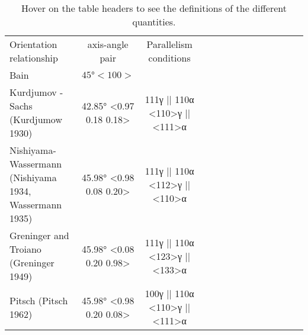 
\begin{table*}
\caption{Hover on the table headers to see the definitions of the  different quantities.}
\label{table}
\begin{tabular}{l c | c c c c c c  c c c c c c}
\hline\hline
    Orientation relationship & axis-angle pair & Parallelism conditions \\
    Bain \cite{bain1924nature} & \(45°<100>\) &  \\
    Kurdjumov -Sachs (Kurdjumow 1930) & 42.85° <0.97 0.18 0.18> & {111}γ || {110}α <110>γ || <111>α \\
    Nishiyama-Wassermann (Nishiyama 1934, Wassermann 1935) & 45.98° <0.98 0.08 0.20> & {111}γ || {110}α <112>γ || <110>α \\
    Greninger and Troiano (Greninger 1949) & 45.98° <0.08 0.20 0.98> & {111}γ || {110}α <123>γ || <133>α \\
    Pitsch (Pitsch 1962) & 45.98° <0.98 0.20 0.08> & {100}γ || {110}α <110>γ || <111>α \\
\hline
\end{tabular}
\end{table*}
